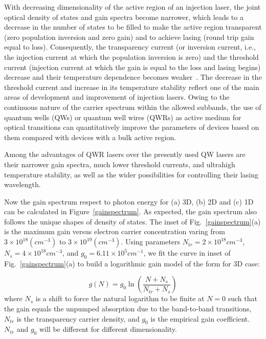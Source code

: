 With decreasing dimensionality of the active region of an injection laser, the
joint optical density of states and gain spectra become narrower, which leads
to a decrease in the number of states to be filled to make the active region
transparent (zero population inversion and zero gain) and to achieve lasing
(round trip gain equal to loss). Consequently, the transparency current (or
inversion current, i.e., the injection current at which the population
inversion is zero) and the threshold current (injection current at which the
gain is equal to the loss and lasing begins) decrease and their temperature
dependence becomes weaker~\cite{asryan2004theory}. The decrease in the
threshold current and increase in its temperature stability reflect one of the
main areas of development and improvement of injection lasers. Owing to the
continuous nature of the carrier spectrum within the allowed subbands, the use
of quantum wells (QWs) or quantum well wires (QWRs) as active medium for
optical transitions can quantitatively improve the parameters of devices based
on them compared with devices with a bulk active region.

Among the advantages of QWR lasers over the presently used QW lasers are their
narrower gain spectra, much lower threshold currents, and ultrahigh temperature
stability, as well as the wider possibilities for controlling their lasing
wavelength.

Now the gain spectrum respect to photon energy for (a) 3D, (b) 2D and (c) 1D
can be calculated in Figure~\ref{gainspectrum}. As expected, the gain spectrum
also follows the unique shapes of density of states. The inset of
Fig.~\ref{gainspectrum}(a) is the maximum gain versus electron carrier
concentration varing from $3\times10^{18} (cm^{-3})$ to
$3\times10^{19}(cm^{-3})$. Using parameters $N_{tr} = 2\times10^{18} cm^{-3}$,
$N_{s} = 4\times10^{18} cm^{-3}$, and $g_0 = 6.11\times10^{5} cm^{-1}$, we fit
the curve in inset of Fig.~\ref{gainspectrum}(a) to build a logarithmic gain
model of the form for 3D case:

\begin{equation}
  g(N) = g_0\ln\left(\frac{N+N_s}{N_{tr}+ N_s}\right)
\end{equation}
where $N_s$ is a shift to force the natural logarithm to be finite at $N = 0$
such that the gain equals the unpumped absorption due to the band-to-band
transitions, $N_{tr}$ is the transparency carrier density, and $g_0$ is the
empirical gain coefficient. $N_{tr}$ and $g_0$ will be different for different
dimensionality.

